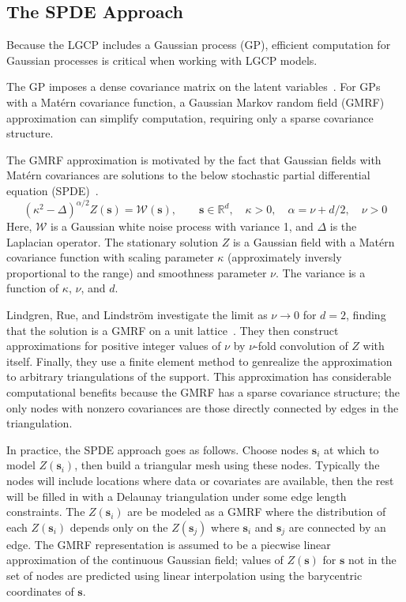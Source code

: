 \documentclass[]{interact}
\begin{document}
\subsection{The SPDE Approach}

Because the LGCP includes a Gaussian process (GP), efficient computation for
Gaussian processes is critical when working with LGCP models.

The GP imposes a dense covariance matrix on the latent variables~\cite{rinla}.
For GPs with a Mat\'{e}rn covariance function, a Gaussian Markov random field
(GMRF) approximation can simplify computation, requiring only a sparse
covariance structure.

The GMRF approximation is motivated by the fact that Gaussian fields with
Mat\'{e}rn covariances are solutions to the below stochastic partial
differential equation (SPDE)~\cite{lindgrenetal}.
\begin{displaymath}
(\kappa^{2} - \Delta)^{\alpha / 2} Z(\mathbf{s}) = \mathcal{W}(\mathbf{s}),
\qquad \mathbf{s} \in \mathbb{R}^d, \quad \kappa > 0,
\quad \alpha = \nu + d/2, \quad \nu > 0
\end{displaymath}
Here, \(\mathcal{W}\) is a Gaussian white noise process with variance 1, and
\(\Delta\) is the Laplacian operator. The stationary solution \(Z\) is a
Gaussian field with a Mat\'{e}rn covariance function with scaling parameter
\(\kappa\) (approximately inversly proportional to the range) and smoothness
parameter \(\nu\). The variance is a function of \(\kappa\), \(\nu\), and
\(d\).

Lindgren, Rue, and Lindstr\"{o}m investigate the limit as \(\nu \to 0\) for
\(d = 2\), finding that the solution is a GMRF on a unit
lattice~\cite{lindgrenetal}. They then construct approximations for positive
integer values of \(\nu\) by \(\nu\)-fold convolution of \(Z\) with itself.
Finally, they use a finite element method to genrealize the approximation
to arbitrary triangulations of the support. This approximation has considerable
computational benefits because the GMRF has a sparse covariance structure; the
only nodes with nonzero covariances are those directly connected by edges in
the triangulation.

In practice, the SPDE approach goes as follows. Choose nodes \(\mathbf{s}_{i}\)
at which to model \(Z(\mathbf{s}_{i})\), then build a triangular mesh using these
nodes. Typically the nodes will include locations where data or covariates are
available, then the rest will be filled in with a Delaunay triangulation under
some edge length constraints. The \(Z(\mathbf{s}_{i})\) are be modeled as a
GMRF where the distribution of each \(Z(\mathbf{s}_{i})\) depends only on the
\(Z(\mathbf{s}_{j})\) where \(\mathbf{s}_{i}\) and \(\mathbf{s}_{j}\) are
connected by an edge. The GMRF representation is assumed to be a piecwise
linear approximation of the continuous Gaussian field; values of
\(Z(\mathbf{s})\) for \(\mathbf{s}\) not in the set of nodes are predicted
using linear interpolation using the barycentric coordinates of
\(\mathbf{s}\).
\end{document}
